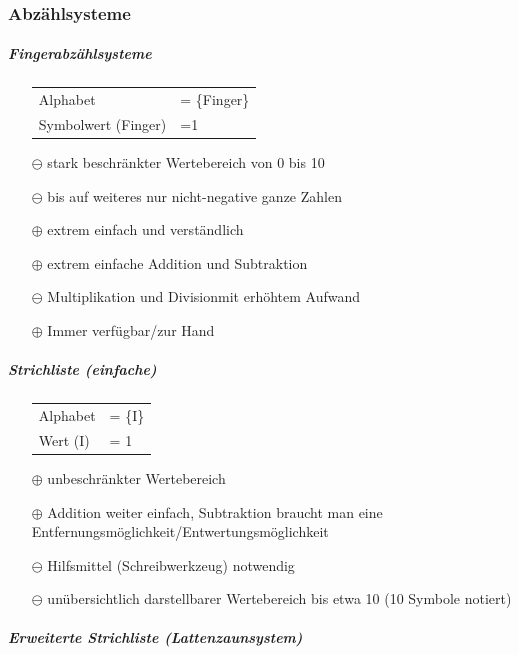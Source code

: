 \documentclass[10pt,a4paper]{scrartcl}
\begin{document}
	\subsubsection{Abzählsysteme}
	\subparagraph{Fingerabzählsysteme}
	\begin{itemize}
		\item[] \begin{tabular}[t]{ll}
			Alphabet & = \{Finger\}\\
			Symbolwert (Finger) & =1\\
		\end{tabular}
		\item[$ \ominus $] stark beschränkter Wertebereich von 0 bis 10
		\item[$ \ominus $] bis auf weiteres nur nicht-negative ganze Zahlen
		\item[$ \oplus $] extrem einfach und verständlich		
		\item[$ \oplus $] extrem einfache Addition und Subtraktion
		\item[$ \ominus $] Multiplikation und Divisionmit erhöhtem Aufwand
		\item[$ \oplus $] Immer verfügbar/\glqq zur Hand\grqq\
	\end{itemize}
	\subparagraph{Strichliste (einfache)}
	\begin{itemize}
		\item[] \begin{tabular}[t]{ll}
		Alphabet &= \{I\}\\
		Wert (I) &= 1\\			
		\end{tabular}
		\item[$ \oplus $] unbeschränkter Wertebereich
		\item[$ \oplus $] Addition weiter einfach, Subtraktion braucht man eine Entfernungsmöglichkeit/Entwertungsmöglichkeit
		\item[$ \ominus $] Hilfsmittel (Schreibwerkzeug) notwendig
		\item[$ \ominus $] unübersichtlich darstellbarer Wertebereich bis etwa 10 (10 Symbole notiert)
	\end{itemize}
	\subparagraph{Erweiterte Strichliste (\glqq Lattenzaunsystem\grqq)}
\end{document}
